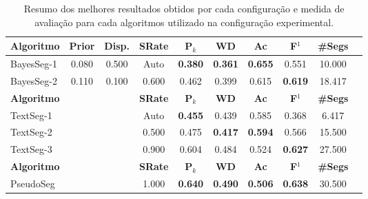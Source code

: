 \begin{table}[!h]
\begin{tabular}{|l||c|c|c|c|c|c|c|c|c|}
\hline
		\textbf{Algoritmo} &
		\textbf{Prior} &
		\textbf{Disp.} & 
		\textbf{SRate}& 
		\textbf{P$_k$} & 
		\textbf{WD} & 
		\textbf{Ac} & 
		\textbf{F$^1$} &
		\textbf{\#Segs} \\	\hline


 BayesSeg-1 & 0.080 & 0.500 &  Auto & \cellcolor{gray!20} \textbf{0.380} & \cellcolor{gray!20} \textbf{0.361} & \cellcolor{gray!20} \textbf{0.655} 
		  & 0.551 & 10.000  \\ \hline 
 BayesSeg-2 & 0.110 & 0.100 & 0.600 & 0.462 & 0.399 & 0.615 
		  & \cellcolor{gray!20} \textbf{0.619} & 18.417  \\ \hline 

\hline
		\textbf{Algoritmo} &&&
		\textbf{SRate} & 
		\textbf{P$_k$} & 
		\textbf{WD} & 
		\textbf{Ac} & 
		\textbf{F$^1$} &
		\textbf{\#Segs} \\	\hline

TextSeg-1 &&& Auto & \cellcolor{gray!20} \textbf{0.455} & 0.439 & 0.585 
		& 0.368 & 6.417  \\ \hline 
TextSeg-2 &&& 0.500 & 0.475 & \cellcolor{gray!20} \textbf{0.417} & \cellcolor{gray!20} \textbf{0.594} 
		& 0.566 & 15.500  \\ \hline 
TextSeg-3 &&& 0.900 & 0.604 & 0.484 & 0.524 
		& \cellcolor{gray!20} \textbf{0.627} & 27.500  \\ \hline 

\hline
		\textbf{Algoritmo} &&&
		\textbf{SRate} & 
		\textbf{P$_k$} & 
		\textbf{WD} & 
		\textbf{Ac} & 
		\textbf{F$^1$} &
		\textbf{\#Segs} \\	\hline


PseudoSeg &&& 1.000& \cellcolor{gray!20} \textbf{0.640} & \cellcolor{gray!20} \textbf{0.490} & \cellcolor{gray!20} \textbf{0.506} 
		   & \cellcolor{gray!20} \textbf{0.638} & 30.500  \\ \hline 



	\end{tabular}
	\caption{Resumo dos melhores resultados obtidos por cada configuração e medida de avaliação para cada algoritmos utilizado na configuração experimental. }
	\label{tab:resumo-resultados}
\end{table}

